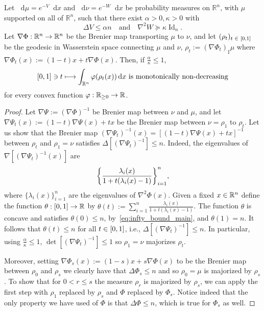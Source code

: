 \documentclass[AHL,Unicode,longabstracts]{cedram}
\newcommand{\R}{\mathbb R}
\DeclareMathOperator{\Id}{Id}
\newcommand{\V}{V}
\newcommand{\W}{W}
\newcommand{\dd}{n}
\newcommand{\prob}{\rho}
\newcommand{\source}{\mu}
\newcommand{\target}{\nu}
\newcommand{\lsh}{\alpha}
\newcommand{\lc}{\kappa}
\newcommand*\diff{\mathop{}\!\mathrm{d}}
\newcommand{\OT}{\Phi}
\newcommand{\cxfun}{\varphi}
\renewcommand*{\to}{\mathchoice{\longrightarrow}{\rightarrow}{\rightarrow}{\rightarrow}}
\let\oldmapsto\mapsto
\renewcommand*{\mapsto}{\mathchoice{\longmapsto}{\oldmapsto}{\oldmapsto}{\oldmapsto}}
\let\originalleft\left
\let\originalright\right
\renewcommand{\left}{\mathopen{}\mathclose\bgroup\originalleft}
\renewcommand{\right}{\aftergroup\egroup\originalright}
\let\oldin\in
\renewcommand{\in}{\mathchoice{\oldin}{\oldin}{\,\oldin\,}{\,\oldin\,}}
\newcounter{setofstep}
\newcounter{step}[setofstep]
\begin{document}
\begin{theo}\label{thm:mono}
Let $\diff\source=e^{-\V}\diff x$ and $\diff\target=e^{-\W}\diff x$ be probability measures on $\R^{\dd}$, with $\source$ supported on all of $\R^{\dd}$, such that there exist $\lsh>0,\lc>0$ with
\[
\Delta \V \le \lsh\dd \quad\text{and}\quad \nabla^2\W \succeq \lc \Id_{\dd}.
\]
Let $\nabla\OT:\R^{\dd}\to\R^{\dd}$ be the Brenier map transporting $\source$ to $\target$, and let $(\prob_t)_{t\in [0,1]}$ be the geodesic in Wasserstein space connecting $\source$ and $\target$, $\prob_t:=(\nabla\OT_t)_{\sharp}\source$ where $\nabla\OT_t(x):=(1-t)x+t\nabla\OT(x)$. Then, if $\frac{\lsh}{\lc}\le 1$,
\begin{equation}\label{eq:mono_geo'}
[0,1]\ni t\mapsto \int_{\R^{\dd}}\cxfun(\prob_t(x))\diff x\textnormal{ is monotonically non-decreasing}
\end{equation}
for every convex function $\cxfun:\R_{\ge 0}\to \R$.
\end{theo}

\begin{proof}
Let $\nabla\Psi:=(\nabla\OT)^{-1}$ be Brenier map between $\target$ and $\source$, and let $\nabla\Psi_t(x):=(1-t)\nabla\Psi(x)+tx$ be the Brenier map between $\target=\prob_1$ to $\prob_t$. Let us show that the Brenier map $(\nabla\Psi_t)^{-1}(x)=[(1-t)\nabla\Psi(x)+tx]^{-1}$ between $\prob_t$ and $\prob_1=\target$ satisfies $\Delta[(\nabla\Psi_t)^{-1}]\le \dd$. Indeed, the eigenvalues of $\nabla[(\nabla\Psi_t)^{-1}(x)]$ are
\[
\left\{\frac{\lambda_i(x)}{1+t(\lambda_i(x)-1)}\right\}_{i=1}^{\dd},
\]
where $\{\lambda_i(x)\}_{i=1}^{\dd}$ are the eigenvalues of $\nabla^2\OT(x)$. Given a fixed $x\in \R^{\dd}$ define the function $\theta:[0,1]\to\R$ by $\theta(t):=\sum_{i=1}^{\dd}\frac{\lambda_i(x)}{1+t(\lambda_i(x)-1)}$. The function $\theta$ is concave and satisfies $\theta(0)\le \dd$, by~\eqref{eq:infty_bound_main}, and $\theta(1)=\dd$. It follows that $\theta(t)\le \dd$ for all $t\in [0,1]$, i.e., $\Delta[(\nabla\Psi_t)^{-1}]\le \dd$. In particular, using $\frac{\lsh}{\lc}\le 1$, $\det[(\nabla\Psi_t)^{-1}]\le 1$ so $\prob_1=\target$ majorizes $\prob_t$.

Moreover, setting \(\nabla \Phi_s(x):=(1-s)x+s \nabla \Phi(x)\) to be the Brenier map between \(\rho_{0}\) and \(\rho_{s}\) we clearly have that \(\Delta \Phi_{s}\le \dd\) and so \(\prob_0=\source\) is majorized by \(\prob_s\). To show that for \(0<r\le s\) the measure $\prob_{r}$ is majorized by \(\prob_s\), we can apply the first step with \(\prob_{1}\) replaced by \(\prob_{s}\) and \(\Phi\) replaced by \(\Phi_{s}\). Notice indeed that the only property we have used of \(\Phi\) is that \(\Delta \Phi \le \dd\), which is true for \(\Phi_{s}\) as well.
\end{proof}
\end{document}
